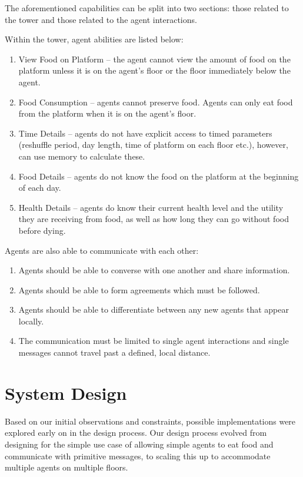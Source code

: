 The aforementioned capabilities can be split into two sections: those related to the tower and those related to the agent interactions.
 
Within the tower, agent abilities are listed below:
\begin{enumerate}
    \item View Food on Platform -- the agent cannot view the amount of food on the platform unless it is on the agent’s floor or the floor immediately below the agent.
    \item Food Consumption -- agents cannot preserve food. Agents can only eat food from the platform when it is on the agent's floor.
    \item Time Details -- agents do not have explicit access to timed parameters (reshuffle period, day length, time of platform on each floor etc.), however, can use memory to calculate these.
    \item Food Details -- agents do not know the food on the platform at the beginning of each day.

    \item Health Details -- agents do know their current health level and the utility they are receiving from food, as well as how long they can go without food before dying.
    
\end{enumerate}

Agents are also able to communicate with each other:
\begin{enumerate}
    \item Agents should be able to converse with one another and share information.
    \item Agents should be able to form agreements which must be followed.
    \item Agents should be able to differentiate between any new agents that appear locally.
    \item The communication must be limited to single agent interactions and single messages cannot travel past a defined, local distance. 
\end{enumerate}

\section{System Design}\label{system_design}

Based on our initial observations and constraints, possible implementations were explored early on in the design process. Our design process evolved from designing for the simple use case of allowing simple agents to eat food and communicate with primitive messages, to scaling this up to accommodate multiple agents on multiple floors.

